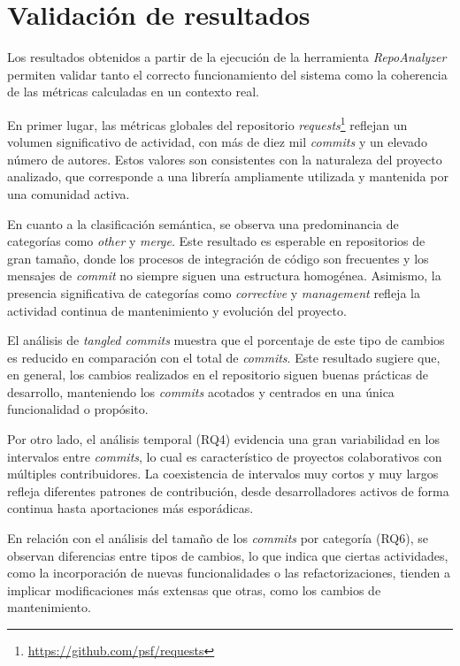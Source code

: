 \documentclass[a4paper, 12pt]{book}
\begin{document}
\section{Validación de resultados}
\label{sec:validacion}

Los resultados obtenidos a partir de la ejecución de la herramienta \emph{RepoAnalyzer} permiten validar tanto el correcto funcionamiento del sistema como la coherencia de las métricas calculadas en un contexto real.

En primer lugar, las métricas globales del repositorio \emph{requests}\footnote{\url{https://github.com/psf/requests}} reflejan un volumen significativo de actividad, con más de diez mil \emph{commits} y un elevado número de autores. Estos valores son consistentes con la naturaleza del proyecto analizado, que corresponde a una librería ampliamente utilizada y mantenida por una comunidad activa.

En cuanto a la clasificación semántica, se observa una predominancia de categorías como \emph{other} y \emph{merge}. Este resultado es esperable en repositorios de gran tamaño, donde los procesos de integración de código son frecuentes y los mensajes de \emph{commit} no siempre siguen una estructura homogénea. Asimismo, la presencia significativa de categorías como \emph{corrective} y \emph{management} refleja la actividad continua de mantenimiento y evolución del proyecto.

El análisis de \emph{tangled commits} muestra que el porcentaje de este tipo de cambios es reducido en comparación con el total de \emph{commits}. Este resultado sugiere que, en general, los cambios realizados en el repositorio siguen buenas prácticas de desarrollo, manteniendo los \emph{commits} acotados y centrados en una única funcionalidad o propósito.

Por otro lado, el análisis temporal (RQ4) evidencia una gran variabilidad en los intervalos entre \emph{commits}, lo cual es característico de proyectos colaborativos con múltiples contribuidores. La coexistencia de intervalos muy cortos y muy largos refleja diferentes patrones de contribución, desde desarrolladores activos de forma continua hasta aportaciones más esporádicas.

En relación con el análisis del tamaño de los \emph{commits} por categoría (RQ6), se observan diferencias entre tipos de cambios, lo que indica que ciertas actividades, como la incorporación de nuevas funcionalidades o las refactorizaciones, tienden a implicar modificaciones más extensas que otras, como los cambios de mantenimiento.
\end{document}

